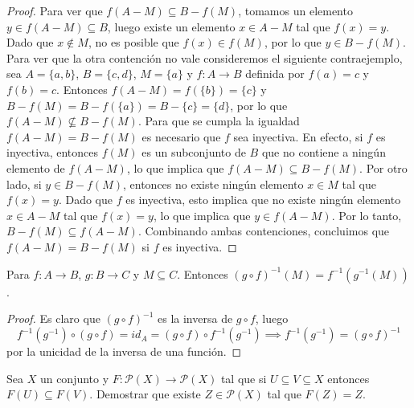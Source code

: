 \documentclass{article}
\theoremstyle{definition}
\newenvironment{ejercicio}[1]{\begin{trivlist}
\item[\hskip \labelsep {\bfseries Ejercicio}\hskip \labelsep {\bfseries #1.}]}{\end{trivlist}}
\begin{document}
\begin{proof}
    Para ver que \( f(A-M) \subseteq B-f(M) \), tomamos un elemento \( y \in f(A - M) \subseteq B \), luego existe un elemento \( x \in A - M \) tal que \( f(x) = y \). Dado que \( x \notin M \), no es posible que \( f(x) \in f(M) \), por lo que \( y \in B - f(M) \).
    Para ver que la otra contención no vale consideremos el siguiente contraejemplo, sea \( A = \{ a, b \} \), \( B = \{ c, d \} \), \( M = \{ a \} \) y \( f : A \to B \) definida por \( f(a) = c \) y \( f(b) = c \). Entonces \( f(A - M) = f(\{ b \}) = \{ c \} \) y \( B - f(M) = B - f(\{ a \}) = B - \{ c \} = \{ d \} \), por lo que \( f(A - M) \not\subseteq B - f(M) \).
    Para que se cumpla la igualdad \( f(A - M) = B - f(M) \) es necesario que \( f \) sea inyectiva. En efecto, si \( f \) es inyectiva, entonces \( f(M) \) es un subconjunto de \( B \) que no contiene a ningún elemento de \( f(A - M) \), lo que implica que \( f(A - M) \subseteq B - f(M) \). Por otro lado, si \( y \in B - f(M) \), entonces no existe ningún elemento \( x \in M \) tal que \( f(x) = y \). Dado que \( f \) es inyectiva, esto implica que no existe ningún elemento \( x \in A - M \) tal que \( f(x) = y \), lo que implica que \( y \in f(A - M) \). Por lo tanto, \( B - f(M) \subseteq f(A - M) \). Combinando ambas contenciones, concluimos que \( f(A - M) = B - f(M) \) si \( f \) es inyectiva.
\end{proof}

\begin{ejercicio}{5}
    Para \(f:A\rightarrow B\), \(g:B\rightarrow C\) y \(M\subseteq C\). Entonces \( {(g\circ f)}^{-1}(M)=f^{-1}(g^{-1}(M)) \).
\end{ejercicio}

\begin{proof}
    Es claro que \( {(g \circ f)}^{-1} \) es la inversa de \( g \circ f \), luego \[
        f^{-1}(g^{-1}) \circ (g \circ f) = id_A = (g \circ f) \circ f^{-1}(g^{-1}) \implies f^{-1}(g^{-1}) = {(g \circ f)}^{-1}
    \]
    por la unicidad de la inversa de una función.
\end{proof}

\begin{ejercicio}{6}
    Sea \( X \) un conjunto y \( F:\mathcal{P}(X)\rightarrow\mathcal{P}(X)\) tal que si \(U\subseteq V\subseteq X\) entonces \(F(U)\subseteq F(V)\). Demostrar que existe \(Z\in\mathcal{P}(X)\) tal que \(F(Z)=Z\).
\end{ejercicio}
\end{document}
